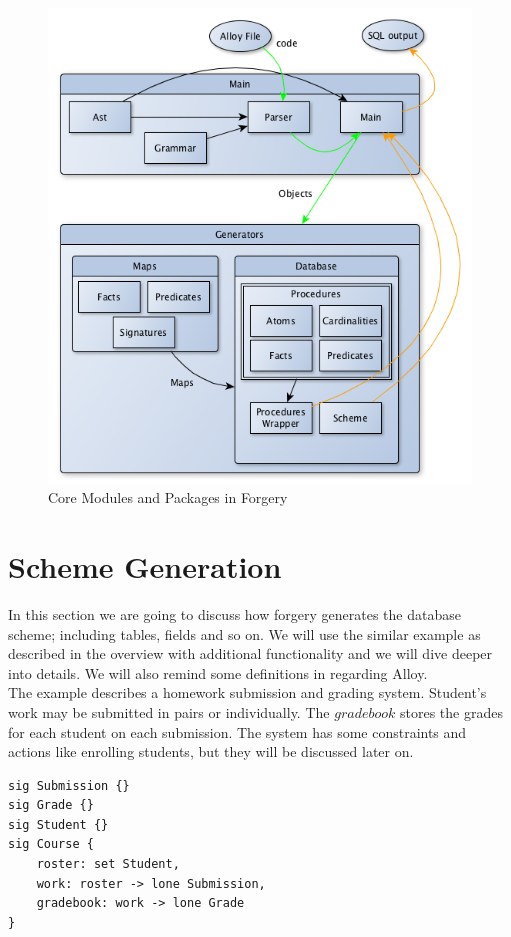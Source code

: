 \documentclass[oneside]{book}
\begin{document}
\begin{figure}[h!]
\centering
\includegraphics[scale=0.5]{modules}
\caption{Core Modules and Packages in Forgery}
\end{figure}

\newpage

\section{Scheme Generation}
\label{sec:schemegen}

In this section we are going to discuss how forgery generates the database scheme; including tables, fields and so on. We will use the similar example as described in the overview with additional functionality and we will dive deeper into details. We will also remind some definitions in regarding Alloy.\\

\noindent The example describes a homework submission and grading system. Student's work may be submitted in pairs or individually. The $gradebook$ stores the grades for each student on each submission. The system has some constraints and actions like enrolling students, but they will be discussed later on.\\
\begin{lstlisting}
sig Submission {}
sig Grade {}
sig Student {}
sig Course {
	roster: set Student,
	work: roster -> lone Submission,
	gradebook: work -> lone Grade
}
\end{lstlisting}
\end{document}

